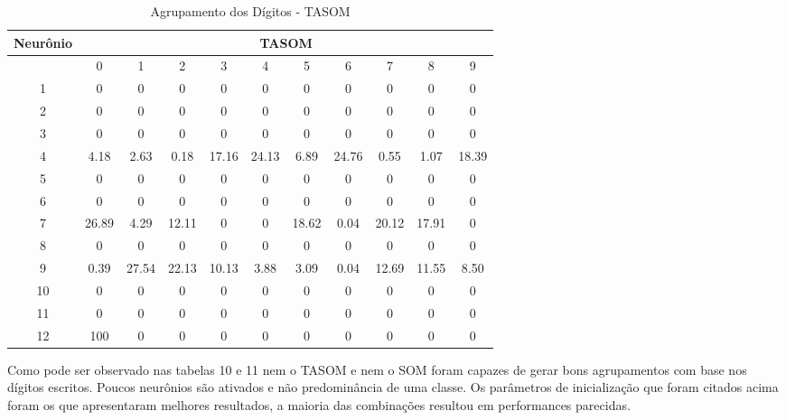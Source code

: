 \begin{table}[h]
\centering
\caption{Agrupamento dos Dígitos - TASOM}
\label{my-label}
\begin{tabular}{|c|c|c|c|c|c|c|c|c|c|c|}
\hline
Neurônio & \multicolumn{10}{c|}{TASOM}                                                   \\ \hline
         & 0     & 1     & 2     & 3     & 4     & 5     & 6     & 7     & 8     & 9     \\ \hline
1        & 0     & 0     & 0     & 0     & 0     & 0     & 0     & 0     & 0     & 0     \\ \hline
2        & 0     & 0     & 0     & 0     & 0     & 0     & 0     & 0     & 0     & 0     \\ \hline
3        & 0     & 0     & 0     & 0     & 0     & 0     & 0     & 0     & 0     & 0     \\ \hline
4        & 4.18  & 2.63  & 0.18  & 17.16 & 24.13 & 6.89  & 24.76 & 0.55  & 1.07  & 18.39 \\ \hline
5        & 0     & 0     & 0     & 0     & 0     & 0     & 0     & 0     & 0     & 0     \\ \hline
6        & 0     & 0     & 0     & 0     & 0     & 0     & 0     & 0     & 0     & 0     \\ \hline
7        & 26.89 & 4.29  & 12.11 & 0     & 0     & 18.62 & 0.04  & 20.12 & 17.91 & 0     \\ \hline
8        & 0     & 0     & 0     & 0     & 0     & 0     & 0     & 0     & 0     & 0     \\ \hline
9        & 0.39  & 27.54 & 22.13 & 10.13 & 3.88  & 3.09  & 0.04  & 12.69 & 11.55 & 8.50  \\ \hline
10       & 0     & 0     & 0     & 0     & 0     & 0     & 0     & 0     & 0     & 0     \\ \hline
11       & 0     & 0     & 0     & 0     & 0     & 0     & 0     & 0     & 0     & 0     \\ \hline
12       & 100   & 0     & 0     & 0     & 0     & 0     & 0     & 0     & 0     & 0     \\ \hline
\end{tabular}
\end{table}

Como pode ser observado nas tabelas 10 e 11 nem o TASOM e nem o SOM foram capazes de gerar bons agrupamentos com base nos dígitos escritos. Poucos neurônios são ativados e não predominância de uma classe. Os parâmetros de inicialização que foram citados acima foram os que apresentaram melhores resultados, a maioria das combinações resultou em performances parecidas.

